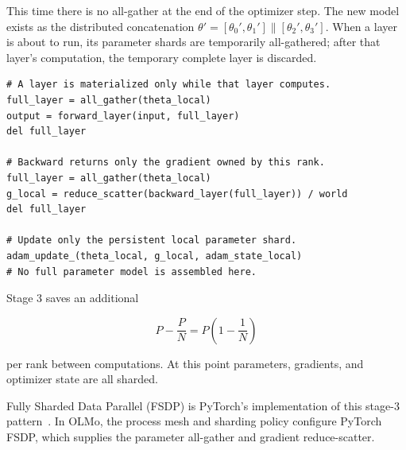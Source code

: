 \documentclass[11pt]{article}
\begin{document}
This time there is no all-gather at the end of the optimizer step. The new
model exists as the distributed concatenation
\(\theta'=[\theta_0',\theta_1']\mathbin{\|}[\theta_2',\theta_3']\).
When a layer is about to run, its parameter shards are temporarily
all-gathered; after that layer's computation, the temporary complete layer is
discarded.

\begin{lstlisting}[basicstyle=\ttfamily\footnotesize]
# A layer is materialized only while that layer computes.
full_layer = all_gather(theta_local)
output = forward_layer(input, full_layer)
del full_layer

# Backward returns only the gradient owned by this rank.
full_layer = all_gather(theta_local)
g_local = reduce_scatter(backward_layer(full_layer)) / world
del full_layer

# Update only the persistent local parameter shard.
adam_update_(theta_local, g_local, adam_state_local)
# No full parameter model is assembled here.
\end{lstlisting}

Stage 3 saves an additional

\[
P-\frac{P}{N}=P\left(1-\frac{1}{N}\right)
\]

per rank between computations. At this point parameters, gradients, and
optimizer state are all sharded.

Fully Sharded Data Parallel (FSDP) is PyTorch's implementation of this
stage-3 pattern~\cite{zhao2023fsdp}. In OLMo, the process mesh and sharding
policy configure PyTorch FSDP, which supplies the parameter all-gather and
gradient reduce-scatter.

\begin{center}
\end{center}
\end{document}
